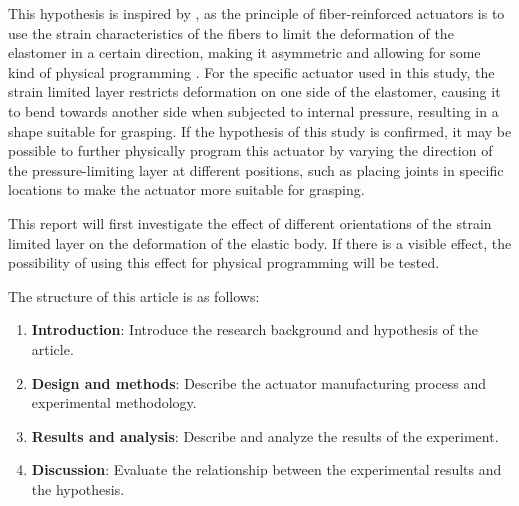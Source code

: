 \documentclass[conference]{IEEEtran}
\begin{document}
This hypothesis is inspired by \cite{mechanical_programing}, as the principle of fiber-reinforced actuators is to use the strain characteristics of the fibers to limit the deformation of the elastomer in a certain direction, making it asymmetric and allowing for some kind of physical programming \cite{fingerlike}. For the specific actuator used in this study, the strain limited layer restricts deformation on one side of the elastomer, causing it to bend towards another side when subjected to internal pressure, resulting in a shape suitable for grasping. If the hypothesis of this study is confirmed, it may be possible to further physically program this actuator by varying the direction of the pressure-limiting layer at different positions, such as placing joints in specific locations to make the actuator more suitable for grasping.


This report will first investigate the effect of different orientations of the strain limited layer on the deformation of the elastic body. If there is a visible effect, the possibility of using this effect for physical programming will be tested.


The structure of this article is as follows:
\begin{enumerate}
    \item \textbf{Introduction}: Introduce the research background and hypothesis of the article.
    \item \textbf{Design and methods}: Describe the actuator manufacturing process and experimental methodology.
    \item \textbf{Results and analysis}: Describe and analyze the results of the experiment.
    \item \textbf{Discussion}: Evaluate the relationship between the experimental results and the hypothesis.
\end{enumerate}








\end{document}
